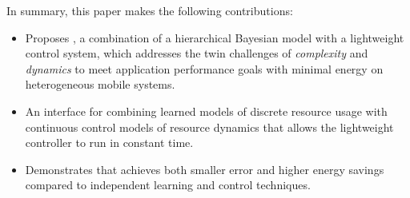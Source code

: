 {In summary, this paper makes the following contributions:
\begin{itemize}
\item Proposes \SYSTEM{}, a combination of a hierarchical Bayesian
  model with a lightweight control system, which addresses the twin
  challenges of \emph{complexity} and \emph{dynamics} to meet
  application performance goals with minimal energy on heterogeneous
  mobile systems.
\item An interface for combining learned models of discrete resource
  usage with continuous control models of resource dynamics that
  allows the lightweight controller to run in constant time.
\item Demonstrates that \SYSTEM{} achieves both smaller error and
  higher energy savings compared to independent learning and control
  techniques.
\end{itemize}
}